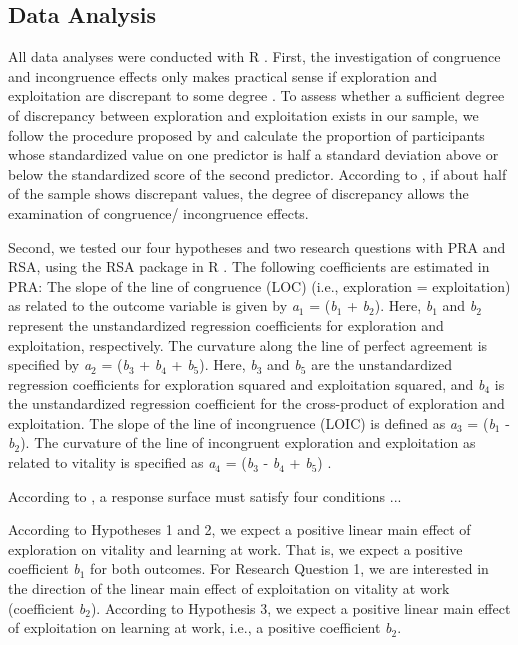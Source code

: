 \documentclass[man]{apa7}
\begin{document}
\subsection{Data Analysis}
All data analyses were conducted with R \parencite{Team2019}. 
First, the investigation of congruence and incongruence effects only makes practical sense if exploration and exploitation are discrepant to some degree \parencite{Shanock.2010b}.
To assess whether a sufficient degree of discrepancy between exploration and exploitation exists in our sample, we follow the procedure proposed by \textcite{Shanock.2010b} and calculate the proportion of participants whose standardized value on one predictor is half a standard deviation above or below the standardized score of the second predictor.  
According to \textcite{Shanock.2010b}, if about half of the sample shows discrepant values, the degree of discrepancy allows the examination of congruence/ incongruence effects. \par 

Second, we tested our four hypotheses and two research questions with PRA and RSA, using the RSA package in R \parencite{Schonbrodt2018}.
The following coefficients are estimated in PRA: The slope of the line of congruence (LOC) (i.e., exploration = exploitation) as related to the outcome variable is given by \textit{a}$_1$ = (\textit{b}$_1$ + \textit{b}$_2$). Here, \textit{b}$_1$ and \textit{b}$_2$ represent the unstandardized regression coefficients for exploration and exploitation, respectively.  
The curvature along the line of perfect agreement is specified by \textit{a}$_2$ = (\textit{b}$_3$ + \textit{b}$_4$ + \textit{b}$_5$). 
Here, \textit{b}$_3$ and \textit{b}$_5$ are the unstandardized regression coefficients for exploration squared and exploitation squared, and \textit{b}$_4$ is the unstandardized regression coefficient for the cross-product of exploration and exploitation. 
The slope of the line of incongruence (LOIC) is defined as \textit{a}$_3$ = (\textit{b}$_1$ - \textit{b}$_2$). 
The curvature of the line of incongruent exploration and exploitation as related to vitality is specified as \textit{a}$_4$ = (\textit{b}$_3$ - \textit{b}$_4$ + \textit{b}$_5$) \parencite{Shanock.2010b, Humberg2019}. 

According to \textcite{Humberg2019}, a response surface must satisfy four conditions ... \par 

According to Hypotheses 1 and 2, we expect a positive linear main effect of exploration on vitality and learning at work. That is, we expect a positive coefficient \textit{b}$_1$ for both outcomes. 
For Research Question 1, we are interested in the direction of the linear main effect of exploitation on vitality at work (coefficient \textit{b}$_2$). 
According to Hypothesis 3, we expect a positive linear main effect of exploitation on learning at work, i.e., a positive coefficient \textit{b}$_2$. \par 
\end{document}
